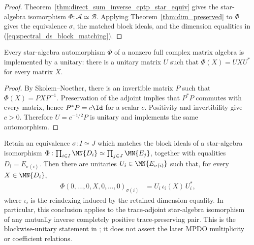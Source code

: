 \begin{proof}
    \leanok
    Theorem~\ref{thm:direct_sum_inverse_cptp_star_equiv} gives the
    star-algebra isomorphism $\Phi:\mathcal A\simeq\mathcal B$. Applying
    Theorem~\ref{thm:dim_preserved} to $\Phi$ gives the equivalence $\sigma$,
    the matched block ideals, and the dimension equalities in
    (\ref{eq:spectral_ds_block_matching}).
\end{proof}

\begin{theorem}%
    \label{thm:unitary_skolem_noether_matrix}
    \leanok
    Every star-algebra automorphism $\Phi$ of a nonzero full complex matrix
    algebra is implemented by a unitary: there is a unitary matrix $U$ such
    that $\Phi(X)=UXU^*$ for every matrix $X$.
\end{theorem}

\begin{proof}\leanok
    By Skolem--Noether, there is an invertible matrix $P$ such that
    $\Phi(X)=PXP^{-1}$. Preservation of the adjoint implies that $P^*P$
    commutes with every matrix, hence $P^*P=c\Id$ for a scalar $c$.
    Positivity and invertibility give $c>0$. Therefore $U=c^{-1/2}P$ is
    unitary and implements the same automorphism.
\end{proof}

\begin{theorem}%
    \label{thm:direct_sum_star_equiv_block_unitary}
    \leanok
    Retain an equivalence $\sigma:I\simeq J$ which matches the block ideals
    of a star-algebra isomorphism
    $\Phi:\prod_{i\in I}\MN{D_i}\simeq\prod_{j\in J}\MN{E_j}$,
    together with equalities $D_i=E_{\sigma(i)}$. Then there are unitaries
    $U_i\in\MN{E_{\sigma(i)}}$ such that, for every
    $X\in\MN{D_i}$,
    \begin{align}
        \Phi(0,\ldots,0,X,0,\ldots,0)_{\sigma(i)}
         & =U_i\,\iota_i(X)\,U_i^*,
        \label{eq:spectral_ds_block_unitary}
    \end{align}
    where $\iota_i$ is the reindexing induced by the retained dimension
    equality. In particular, this conclusion applies to the trace-adjoint
    star-algebra isomorphism of any mutually inverse completely positive
    trace-preserving pair. This is the blockwise-unitary statement in
    \cite[Appendix~C.4, line~1997]{Cirac2016MPDO_arXiv}; it does not assert
    the later MPDO multiplicity or coefficient relations.
\end{theorem}

